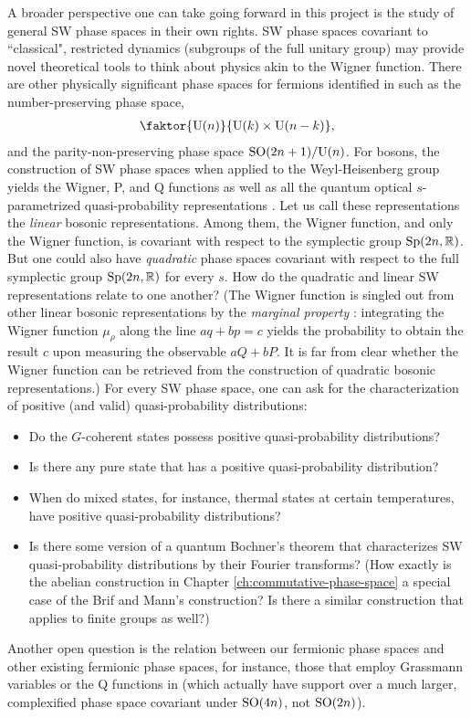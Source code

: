 A broader perspective one can take going forward in this project is the study of general SW phase spaces in their own rights. SW phase spaces covariant to ``classical", restricted dynamics (subgroups of the full unitary group) may provide novel theoretical tools to think about physics akin to the Wigner function. There are other physically significant phase spaces for fermions identified in \cite{zhang_coherent_1990} such as the number-preserving phase space,
\begin{align}
\faktor{\gr{U}{n}}{\gr{U}{k} \times \gr{U}{n-k}},\nonumber
\end{align} 
and the parity-non-preserving phase space $\text{SO}(2n+1)/\text{U}(n)$. For bosons, the construction of SW phase spaces when applied to the Weyl-Heisenberg group yields the Wigner, P, and Q functions as well as all the quantum optical $s$-parametrized quasi-probability representations \cite{brif_phase-space_1999}. Let us call these representations the \emph{linear} bosonic representations. Among them, the Wigner function, and only the Wigner function, is covariant with respect to the symplectic group $\text{Sp}(2n,\mathbb{R})$. But one could also have \emph{quadratic} phase spaces covariant with respect to the full symplectic group $\text{Sp}(2n,\mathbb{R})$ for every $s$. How do the quadratic and linear SW representations relate to one another? (The Wigner function is singled out from other linear bosonic representations by the \emph{marginal property} \cite{bertrand_tomographic_1987}: integrating the Wigner function $\mu_{\rho}$ along the line $aq+bp=c$ yields the probability to obtain the result $c$ upon measuring the observable $aQ+bP$. It is far from clear whether the Wigner function can be retrieved from the construction of quadratic bosonic representations.) For every SW phase space, one can ask for the characterization of positive (and valid) quasi-probability distributions:
\begin{itemize}
	\item Do the $G$-coherent states possess positive quasi-probability distributions?
	\item Is there any pure state that has a positive quasi-probability distribution?
	\item When do mixed states, for instance, thermal states at certain temperatures, have positive quasi-probability distributions?
	\item Is there some version of a quantum Bochner's theorem that characterizes SW quasi-probability distributions by their Fourier transforms? (How exactly is the abelian construction in Chapter \ref{ch:commutative-phase-space} a special case of the Brif and Mann's construction? Is there a similar construction that applies to finite groups as well?)
\end{itemize}
Another open question is the relation between our fermionic phase spaces and other existing fermionic phase spaces, for instance, those that employ Grassmann variables \cite{cahill_density_1999,dalton2014phase} or the Q functions in \cite{corney_gaussian_2006-1,corney_gaussian_2006,rosales-zarate_probabilistic_2015} (which actually have support over a much larger, complexified phase space covariant under $\text{SO}(4n)$, not $\text{SO}(2n)$).

